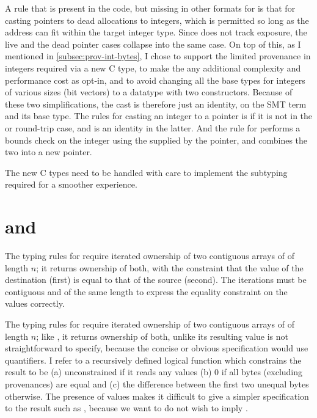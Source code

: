 A rule that is present in the code, but missing in other formats for
 is that for casting pointers to dead allocations to integers,
which is permitted so long as the address can fit within the target integer
type. Since  does not track exposure, the live and the dead
pointer cases collapse into the same case. On top of this, as I mentioned in
\cref{subsec:prov-int-bytes}, I chose to support the limited provenance in
integers required via a new C type, to make the any additional complexity and
performance cost as opt-in, and to avoid changing all the base types for
integers of various sizes (bit vectors) to a datatype with two constructors.
Because of these two simplifications, the cast is therefore just an identity,
on the SMT term and its base type. The rules for
casting an integer to a pointer is  if it is not in the 
or round-trip case, and is an identity in the latter. And the rule for  performs a bounds check on
the integer using the  supplied by the pointer, and combines the
two into a new pointer.

The new C types need to be handled with care to implement the subtyping
required for a smoother experience.

\section{ and }

The typing rules for  require iterated ownership of two
contiguous arrays of  of length $n$; it returns ownership of
both, with the constraint that the value of the destination (first) is equal to
that of the source (second). The iterations must be contiguous and of the same
length to express the equality constraint on the values correctly.

The typing rules for  require iterated ownership of two
contiguous arrays of  of length $n$; like , it
returns ownership of both, unlike  its resulting value is not
straightforward to specify, because the concise or obvious specification would
use quantifiers. I refer to a recursively defined logical function which
constrains the result to be (a) unconstrained if it reads any
 values (b) 0 if all bytes (excluding provenances) are equal
and (c) the difference between the first two unequal bytes otherwise. The presence
of  values makes it difficult to give a simpler specification
to the result such as , because we want to do not wish to imply %
.

